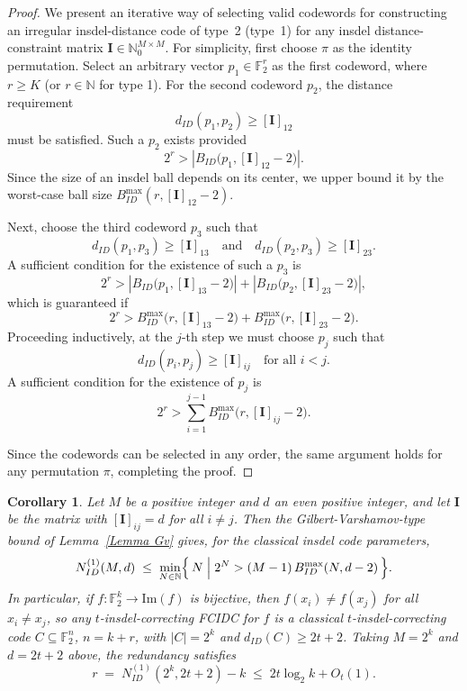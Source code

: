 \documentclass[11 pt]{article}
\numberwithin{equation}{section}
\newtheorem{corollary}[theorem]{Corollary}
\begin{document}
    \begin{proof}
        We present an iterative way of selecting valid codewords for constructing an irregular insdel-distance code of type~2 (type~1) for any insdel distance-constraint matrix $\mathbf{I} \in \mathbb{N}_0^{M \times M}$.
        For simplicity, first choose $\pi$ as the identity permutation.
        Select an arbitrary vector $p_1 \in \mathbb{F}_2^r$ as the first codeword, where $r \ge K$ (or $r \in \mathbb{N}$ for type 1).
        For the second codeword $p_2$, the distance requirement 
        \[
            d_{ID}(p_1,p_2) \ge [\boldsymbol{I}]_{12}
        \]
        must be satisfied. Such a $p_2$ exists provided
        \[
            2^r > \left| B_{ID}\big(p_1,[\boldsymbol{I}]_{12}-2\big) \right|.
        \]
        Since the size of an insdel ball depends on its center, we upper bound it by the worst-case ball size $B^{\max}_{ID}(r,[\boldsymbol{I}]_{12}-2)$.

        Next, choose the third codeword $p_3$ such that
        \[
            d_{ID}(p_1,p_3) \ge [\boldsymbol{I}]_{13}
            \quad \text{and} \quad
            d_{ID}(p_2,p_3) \ge [\boldsymbol{I}]_{23}.
        \]
        A sufficient condition for the existence of such a $p_3$ is
        \[
            2^r >
            \left| B_{ID}\big(p_1,[\boldsymbol{I}]_{13}-2\big) \right| + \left| B_{ID}\big(p_2,[\boldsymbol{I}]_{23}-2\big) \right|,
        \]
        which is guaranteed if
        \[
            2^r > B^{\max}_{ID}\big(r,[\bm{I}]_{13}-2\big) + B^{\max}_{ID}\big(r,[\bm{I}]_{23}-2\big).
        \]
        Proceeding inductively, at the $j$-th step we must choose $p_j$ such that
        \[
        d_{ID}(p_i,p_j) \ge [\boldsymbol{I}]_{ij}
        \quad \text{for all } i<j.
        \]
        A sufficient condition for the existence of $p_j$ is
        \[
            2^r >
            \sum_{i=1}^{j-1}
            B^{\max}_{ID}\big(r,[\boldsymbol{I}]_{ij}-2\big).
        \]

        Since the codewords can be selected in any order, the same argument holds for any permutation $\pi$, completing the proof.
    \end{proof}
    
    \begin{corollary}
    \label{cor:bijective-GV}
    Let $M$ be a positive integer and $d$ an even positive integer, and let $\mathbf{I}$ be the matrix with $[\mathbf{I}]_{ij}=d$ for all $i\neq j$. Then the Gilbert-Varshamov-type bound of Lemma~\ref{Lemma Gv} gives, for the classical insdel code parameters,
    \[
    N^{(1)}_{ID}(M,d)\;\le\;
    \min_{N\in\mathbb{N}}\Bigl\{\,N \;\Big|\; 2^{N}>(M-1)\,B^{\max}_{ID}(N,d-2)\,\Bigr\}.
    \]
    In particular, if $f:\mathbb{F}_2^k\to\mathrm{Im}(f)$ is bijective, then $f(x_i)\neq f(x_j)$ for all $x_i\neq x_j$, so any $t$-insdel-correcting FCIDC for $f$ is a classical $t$-insdel-correcting code $C\subseteq\mathbb{F}_2^{n}$, $n=k+r$, with $|C|=2^k$ and $d_{ID}(C)\geq 2t+2$. Taking $M=2^k$ and $d=2t+2$ above, the redundancy satisfies
    \[
    r \;=\; N^{(1)}_{ID}(2^k,2t+2)-k \;\leq\; 2t\log_2 k + O_t(1).
    \]
    \end{corollary}
\end{document}
